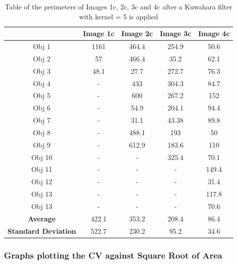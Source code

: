\documentclass[runningheads]{llncs}
\begin{document}
\begin{table}[h!]
\centering
\begin{tabular}{|c|c|c|c|c|}
\hline
\textbf{} & \textbf{Image 1c} & \textbf{Image 2c} & \textbf{Image 3c} & \textbf{Image 4c} \\
\hline
Obj 1 & 1161    & 464.4 & 254.9 &  50.6\\ \hline
Obj 2 &  57     & 466.4  & 35.2 & 62.1\\ \hline
Obj 3 &  48.1    & 27.7    & 272.7 &  76.3\\ \hline
Obj 4 &   -     &  433  & 304.3 &  84.7\\ \hline
Obj 5 &   -     & 600  &   267.2  &  152\\ \hline
Obj 6 &   -     & 54.9  &  204.1 &  94.4\\ \hline
Obj 7 &   -     &  31.1  & 43.38 &  89.8\\ \hline
Obj 8 &   -     &  488.1  & 193 &  50 \\ \hline
Obj 9 &   -    &  612.9     & 183.6    & 110\\ \hline
Obj 10 &  -          &  -     & 325.4    & 70.1\\ \hline
Obj 11 &   -     &  -  & -              &  149.4 \\ \hline
Obj 12 &   -    &  -     & -            & 31.4\\ \hline
Obj 13 &  -          &  -     & -    & 117.8 \\ \hline
Obj 13 &  -          &  -     & -    & 70.6 \\ \hline
\textbf{Average} &   422.1  &  353.2   &   208.4   & 86.4  \\ \hline
\textbf{Standard Deviation} &  522.7 &  230.2  &  95.2 & 34.6 \\ \hline
\end{tabular}
\caption{Table of the perimeters of Images 1c, 2c, 3c and 4c after a Kuwahara filter with kernel = 5 is applied}
\label{tab:Perimeter-SeriesC-Kuwahara5}
\end{table}

\newpage
\subsubsection*{Graphs plotting the CV against Square Root of Area}
\end{document}
